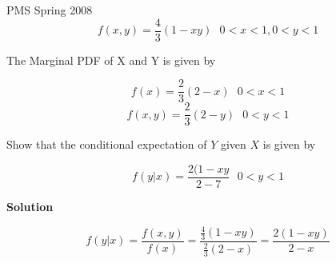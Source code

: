 

PMS Spring 2008 
\[f(x,y) = \frac{4}{3}(1-xy) \mbox{   }0<x<1,0<y<1  \]

The Marginal PDF of X and Y is given by 

\[f(x) = \frac{2}{3}(2-x) \mbox{   }0<x<1 \]
\[f(x,y) = \frac{2}{3}(2-y) \mbox{   }0<y<1  \]

Show that the conditional expectation of $Y$ given $X$ is given by

\[ f(y|x) = \frac{2(1-xy}{2-7} \mbox{   }0<y<1\]

\textbf{Solution}

\[ f(y|x) = \frac{f(x,y)}{f(x)} = \frac{\frac{4}{3}(1-xy)}{\frac{2}{3}(2-x)} = \frac{2(1-xy)}{2-x}\]